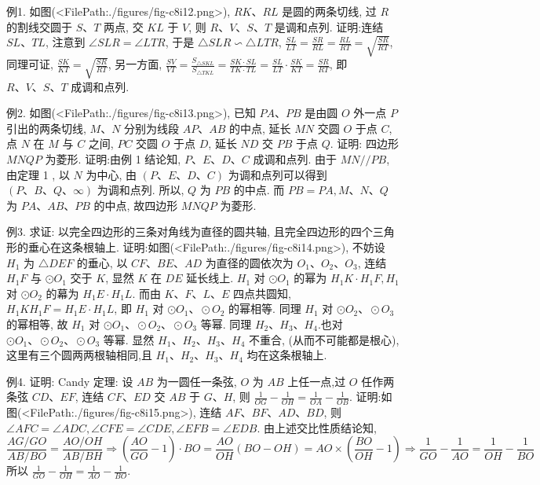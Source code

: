 例1. 如图(<FilePath:./figures/fig-c8i12.png>), $R K 、 R L$ 是圆的两条切线, 过 $R$ 的割线交圆于 $S 、 T$ 两点, 交 $K L$ 于 $V$, 则 $R 、 V 、 S 、 T$ 是调和点列.
证明:连结 $S L 、 T L$, 注意到 $\angle S L R=\angle L T R$, 于是 $\triangle S L R \backsim \triangle L T R$,
$\frac{S L}{L T}=\frac{S R}{R L}=\frac{R L}{R T}=\sqrt{\frac{S R}{R T}}$, 同理可证, $\frac{S K}{K T}= \sqrt{\frac{S R}{R T}}$, 另一方面, $\frac{S V}{V T}=\frac{S_{\triangle S K L}}{S_{\triangle T K L}}=\frac{S K \cdot S L}{T K \cdot T L}= \frac{S L}{L T} \cdot \frac{S K}{K T}=\frac{S R}{R T}$, 即 $R 、 V 、 S 、 T$ 成调和点列.



例2. 如图(<FilePath:./figures/fig-c8i13.png>), 已知 $P A 、 P B$ 是由圆 $O$ 外一点 $P$ 引出的两条切线, $M 、 N$ 分别为线段 $A P 、 A B$ 的中点, 延长 $M N$ 交圆 $O$ 于点 $C$, 点 $N$ 在 $M$ 与 $C$ 之间, $P C$ 交圆 $O$ 于点 $D$, 延长 $N D$ 交 $P B$ 于点 $Q$. 证明: 四边形 $M N Q P$ 为菱形.
证明:由例 1 结论知, $P 、 E 、 D 、 C$ 成调和点列.
由于 $M N / / P B$, 由定理 1 , 以 $N$ 为中心, 由 $(P 、 E 、 D 、 C)$ 为调和点列可以得到 $(P 、 B 、 Q 、 \infty)$ 为调和点列.
所以, $Q$ 为 $P B$ 的中点.
而 $P B=P A, M 、 N 、 Q$ 为 $P A 、 A B 、 P B$ 的中点, 故四边形 $M N Q P$ 为菱形.



例3. 求证: 以完全四边形的三条对角线为直径的圆共轴, 且完全四边形的四个三角形的垂心在这条根轴上.
证明:如图(<FilePath:./figures/fig-c8i14.png>), 不妨设 $H_1$ 为 $\triangle D E F$ 的垂心, 以 $C F 、 B E 、 A D$ 为直径的圆依次为 $O_1 、 O_2 、 O_3$, 连结 $H_1 F$ 与 $\odot O_1$ 交于 $K$, 显然 $K$ 在 $D E$ 延长线上.
$H_1$ 对 $\odot O_1$ 的幂为 $H_1 K \cdot H_1 F, H_1$ 对 $\odot O_2$ 的幕为 $H_1 E \cdot H_1 L$.
而由 $K 、 F 、 L 、 E$ 四点共圆知, $H_1 K H_1 F=H_1 E \cdot H_1 L$, 即 $H_1$ 对 $\odot O_1 、 \odot O_2$ 的幂相等.
同理 $H_1$ 对 $\odot O_2 、 \odot O_3$ 的幂相等, 故 $H_1$ 对 $\odot O_1 、 \odot O_2 、 \odot O_3$ 等幂.
同理 $H_2 、 H_3 、 H_4$.也对 $\odot O_1 、 \odot O_2 、 \odot O_3$ 等幂.
显然 $H_1 、 H_2 、 H_3 、 H_4$ 不重合, (从而不可能都是根心), 这里有三个圆两两根轴相同,且 $H_1 、 H_2 、 H_3 、 H_4$ 均在这条根轴上.



例4. 证明:
Candy 定理: 设 $A B$ 为一圆任一条弦, $O$ 为 $A B$ 上任一点,过 $O$ 任作两条弦 $C D 、 E F$, 连结 $C F 、 E D$ 交 $A B$ 于 $G 、 H$, 则 $\frac{1}{O G}-\frac{1}{O H}=\frac{1}{O A}-\frac{1}{O B}$.
证明:如图(<FilePath:./figures/fig-c8i15.png>), 连结 $A F 、 B F 、 A D 、 B D$, 则 $\angle A F C=\angle A D C, \angle C F E=\angle C D E, \angle E F B=\angle E D B$.
由上述交比性质结论知,
$$
\frac{A G / G O}{A B / B O}=\frac{A O / O H}{A B / B H} \Rightarrow\left(\frac{A O}{G O}-1\right) \cdot B O=\frac{A O}{O H}  (B O-O H)=A O \times\left(\frac{B O}{O H}-1\right) \Rightarrow \frac{1}{G O}-\frac{1}{A O}=\frac{1}{O H}-\frac{1}{B O}
$$
所以 $\frac{1}{G O}-\frac{1}{O H}= \frac{1}{A O}-\frac{1}{B O}$.



